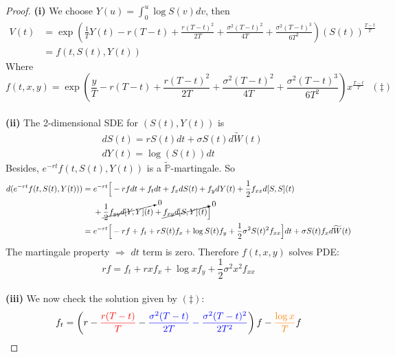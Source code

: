 \documentclass[a4paper, 10pt]{article}
\theoremstyle{definition}
\theoremstyle{hSol}
\begin{document}
\begin{proof} \textbf{(i)} We choose $Y(u) = \int_0^u \log S(v)dv$, then
\begin{equation}
  \begin{split}
    V(t) &= \exp\left(\frac{1}{T}Y(t) - r(T-t)+\frac{r(T-t)^2}{2T}+\frac{\sigma^2(T-t)^2}{4T}+\frac{\sigma^2(T-t)^3}{6T^2}\right)\left(S(t)\right)^{\frac{T-t}{T}} \\
    &= f(t, S(t), Y(t))
  \end{split}
\end{equation}
Where
$$
f(t,x,y) = \exp\left(\frac{y}{T} - r(T-t)+\frac{r(T-t)^2}{2T}+\frac{\sigma^2(T-t)^2}{4T}+\frac{\sigma^2(T-t)^3}{6T^2}\right)x^{\frac{T-t}{T}}~~~(\ddag)
$$
~\\
\textbf{(ii)} The 2-dimensional SDE for $(S(t),Y(t))$ is
\begin{equation}
  \begin{split}
    &dS(t) =  rS(t)dt + \sigma S(t)d\widetilde{W}(t) \\
    &dY(t) =  \log (S(t))dt
  \end{split}
\end{equation}
Besides, $e^{-rt}f(t, S(t), Y(t))$ is a $\widetilde{\mathbb{P}}$-martingale. So
\begin{equation}
  \begin{split}
    d(e^{-rt}f(t, S(t), Y(t))) &= e^{-rt} \Big[-rfdt + f_t dt + f_x dS(t) + f_y dY(t) + \frac{1}{2}f_{xx} d[S,S](t) \\
    &~~~~+\cancelto{0}{\frac{1}{2}f_{yy} d[Y,Y](t)} + \cancelto{0}{f_{xy}d[S,Y](t)}\Big] \\
    &= e^{-rt} \Big[-rf + f_t + rS(t)f_x + \log S(t) f_y + \frac{1}{2} \sigma^2 S(t)^2f_{xx} \Big]dt + \sigma S(t)f_x d\widetilde{W}(t)
  \end{split}
\end{equation}
The martingale property $\Rightarrow$ $dt$ term is zero. Therefore $f(t, x, y)$ solves PDE:
\begin{equation}
  rf = f_t + rxf_x + \log x f_y + \frac{1}{2} \sigma^2 x^2f_{xx}
\end{equation}
~\\
\textbf{(iii)} We now check the solution given by $(\ddag)$:
\begin{equation}
  \begin{split}
    &f_t = \left(r-\textcolor{red}{\frac{r(T-t)}{T}}-\textcolor{blue}{\frac{\sigma^2(T-t)}{2T}-\frac{\sigma^2(T-t)^2}{2T^2}}\right)f - \textcolor{orange}{\frac{\log x}{T}}f \\

\end{split}
\end{equation}
\end{proof}
\end{document}
